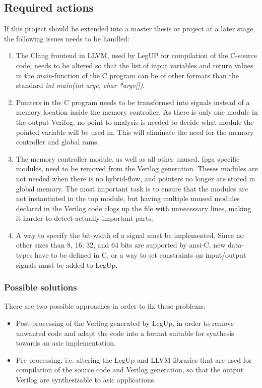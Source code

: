 \subsection{Required actions}
\label{subsec:reqact}
If this project should be extended into a master thesis or project at a later stage, the following issues needs to be handled:
\begin{enumerate}
    \item \label{item:futworkprob}The Clang frontend in LLVM, used by LegUP for compilation of the C-source code, needs to be altered so that the list of input variables and return values in the \textit{main}-function of the C program can be of other formats than the standard \textit{int main(int argc, char *argv[])}.
    \item Pointers in the C program needs to be transformed into signals instead of a memory location inside the memory controller. As there is only one module in the output Verilog, no point-to analysis is needed to decide what module the pointed variable will be used in. This will eliminate the need for the memory controller and global \gls{ram}s.
    \item The memory controller module, as well as all other unused, \gls{fpga} specific modules, need to be removed from the Verilog generation. Theses modules are not needed when there is no hybrid-flow, and pointers no longer are stored in global memory. The most important task is to ensure that the modules are not instantiated in the top module, but having multiple unused modules declared in the Verilog code clogs up the file with unnecessary lines, making it harder to detect actually important parts.
    \item A way to specify the bit-width of a signal must be implemented. Since no other sizes than 8, 16, 32, and 64 bits are supported by \gls{ansi}-C, new data-types have to be defined in C, or a way to set constraints on input/output signals must be added to LegUp.
\end{enumerate}

\subsubsection{Possible solutions}

There are two possible approaches in order to fix these problems:
\begin{itemize}
\item Post-processing of the Verilog generated by LegUp, in order to remove unwanted code and adapt the code into a format suitable for synthesis towards an \gls{asic} implementation.
\item Pre-processing, i.e. altering the LegUp and LLVM libraries that are used for compilation of the source code and Verilog generation, so that the output Verilog are synthesizable to \gls{asic} applications.
\end{itemize}

